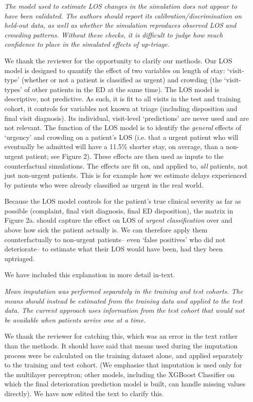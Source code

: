 \textit{    
     The model used to estimate LOS changes in the simulation does not appear to have been validated. The authors should report its calibration/discrimination on held-out data, as well as whether the simulation reproduces observed LOS and crowding patterns. Without these checks, it is difficult to judge how much confidence to place in the simulated effects of up-triage.
}

We thank the reviewer for the opportunity to clarify our methods. Our LOS model is designed to quantify the effect of two variables on length of stay: `visit-type' (whether or not a patient is classified as urgent) and crowding (the `visit-types' of other patients in the ED at the same time). The LOS model is descriptive, not predictive. As such, it is fit to all visits in the test and training cohort, it controls for variables not known at triage (including disposition and final visit diagnosis). Its individual, visit-level `predictions' are never used and are not relevant. The function of the LOS model is to identify the \textit{general} effects of `urgency' and crowding on a patient's LOS (i.e. that a urgent patient who will eventually be admitted will have a 11.5\% shorter stay, on average, than a non-urgent patient; see Figure 2). These effects are then used as inputs to the counterfactual simulations. The effects are fit on, and applied to, \textit{all} patients, not just non-urgent patients. This is for example how we estimate delays experienced by patients who were already classified as urgent in the real world. 

Because the LOS model controls for the patient's true clinical severity as far as possible (complaint, final visit diagnosis, final ED disposition), the matrix in Figure 2a. should capture the effect on LOS of\textit{ urgent classification} over and above how sick the patient actually is. We can therefore apply them counterfactually to non-urgent patients-- even `false positives' who did not deteriorate-- to estimate what their LOS would have been, had they been uptriaged. 

We have included this explanation in more detail in-text. 

    
\textit{     Mean imputation was performed separately in the training and test cohorts. The means should instead be estimated from the training data and applied to the test data. The current approach uses information from the test cohort that would not be available when patients arrive one at a time.}

We thank the reviewer for catching this, which was an error in the text rather than the methods. It should have said that means used during the imputation process were be calculated on the training dataset alone, and applied separately to the training and test cohort. (We emphasise that imputation is used only for the multilayer perceptron; other models, including the XGBoost Classifier on which the final deterioration prediction model is built, can handle missing values directly). We have now edited the text to clarify this.

